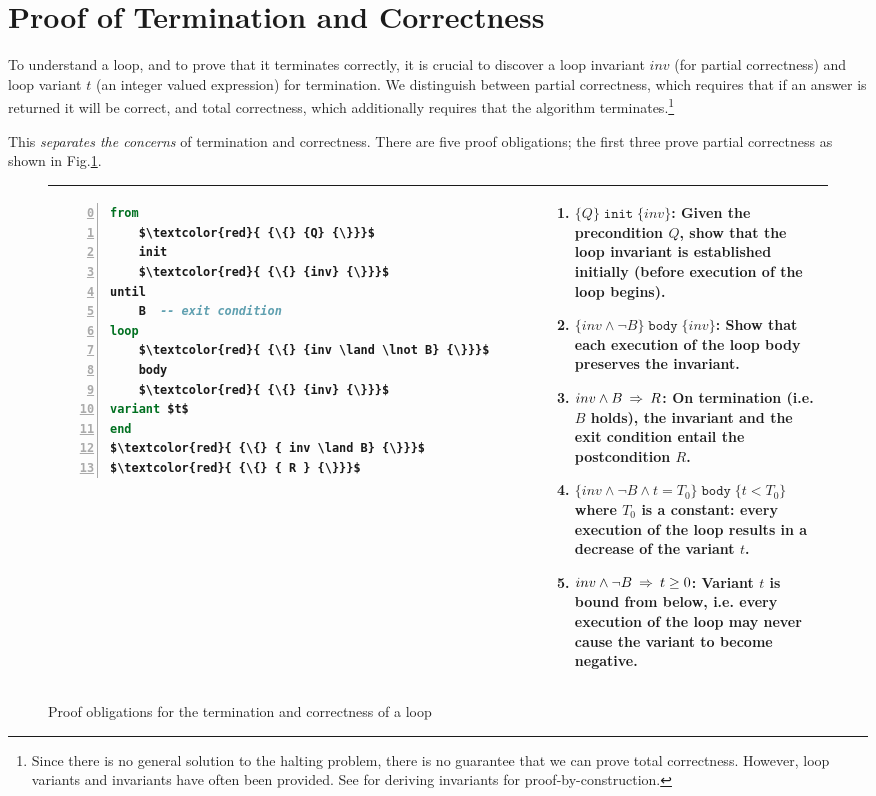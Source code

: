 \documentclass[runningheads,12pt]{article}
\def\assert#1{\textcolor{red}{ {\{} {#1} {\}}}}
\begin{document}
\section{Proof of Termination and Correctness}\label{proofs}

To understand a loop, and to prove that it terminates correctly, it is crucial to discover a loop invariant $inv$ (for partial correctness) and loop variant $t$ (an integer valued expression) for termination. We distinguish between partial correctness, which requires that if an answer is returned it will be correct, and total correctness, which additionally requires that the algorithm terminates.\footnote{Since there is no general solution to the halting problem, there is no guarantee that we can prove total correctness. However, loop variants and invariants have often been provided. See \cite{Gries1993,Gries1985} for deriving invariants for proof-by-construction.} 

This \textit{separates the concerns} of termination and correctness. There are five proof obligations; the first three prove partial correctness as shown in Fig.\ref{fig:gcd-loop-template}.

\begin{figure}[!htb]
\caption{Proof obligations for the termination and correctness of a loop}
\label{fig:gcd-loop-template}
\begin{tabular}{|p{}|p{}|}
\hline
\begin{lstlisting}[language=eiffel,numbers=left,firstnumber=0]
from
	$\assert{Q}$
	init
	$\assert{inv}$
until
	B  -- exit condition 
loop
	$\assert{inv \land \lnot B}$
	body
	$\assert{inv}$
variant $t$
end
$\assert{ inv \land B}$
$\assert{ R }$
\end{lstlisting}
 &  
 \footnotesize
\begin{enumerate}
  \item $\{Q\}\; \texttt{init} \;\{inv\}$: Given the precondition $Q$, show that the loop invariant is established initially (before execution of the loop begins).
  \item $\{inv \land \lnot B\}\; \texttt{body} \;\{inv\}$: Show that each execution of the loop body preserves the invariant. 
  \item $inv \land B \; \mathbin\Rightarrow \; R$: On termination (i.e. $B$ holds), the invariant and the exit condition entail the postcondition $R$.
  \item $\{inv \land \lnot B \land t = T_0\}\; \texttt{body} \;\{t < T_0\}$ where $T_0$ is a constant: every execution of the loop results in a decrease of the variant $t$. 
  \item $inv \land \lnot B \; \mathbin\Rightarrow \; t \geq 0$: Variant $t$ is bound from below, i.e. every execution of the loop may never cause the variant to become negative. 
\end{enumerate}
\\ \hline
\end{tabular}

\end{figure}
\end{document}
